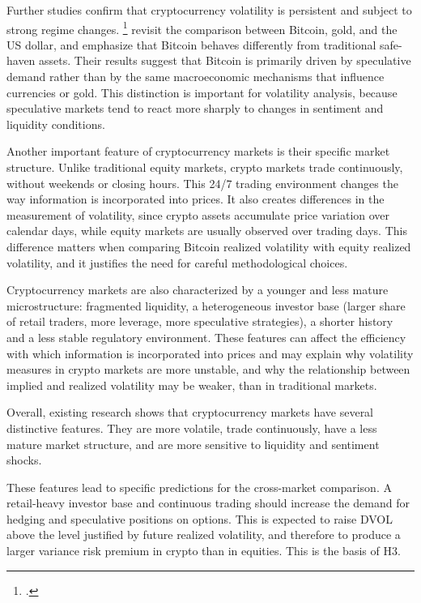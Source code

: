 \documentclass[11pt,a4paper,openany]{report}
\newcommand{\fcitet}[1]{\citet{#1}\footnote{\bibentry{#1}.}}
\begin{document}
Further studies confirm that cryptocurrency volatility is persistent and
subject to strong regime changes. \fcitet{baur2018} revisit the comparison between
Bitcoin, gold, and the US dollar, and emphasize that Bitcoin behaves
differently from traditional safe-haven assets. Their results suggest
that Bitcoin is primarily driven by speculative demand rather than by
the same macroeconomic mechanisms that influence currencies or gold.
This distinction is important for volatility analysis, because
speculative markets tend to react more sharply to changes in sentiment
and liquidity conditions.

Another important feature of cryptocurrency markets is their specific
market structure. Unlike traditional equity markets, crypto markets
trade continuously, without weekends or closing hours. This 24/7 trading
environment changes the way information is incorporated into prices. It
also creates differences in the measurement of volatility, since crypto
assets accumulate price variation over calendar days, while equity
markets are usually observed over trading days. This difference matters
when comparing Bitcoin realized volatility with equity realized
volatility, and it justifies the need for careful methodological
choices.

Cryptocurrency markets are also characterized by a younger and less
mature microstructure: fragmented liquidity, a heterogeneous investor
base (larger share of retail traders, more leverage, more speculative
strategies), a shorter history and a less stable regulatory
environment. These features can affect the efficiency with which
information is incorporated into prices and may explain why volatility
measures in crypto markets are more unstable, and why the relationship
between implied and realized volatility may be weaker, than in
traditional markets.

Overall, existing research shows that cryptocurrency markets have
several distinctive features. They are more volatile, trade
continuously, have a less mature market structure, and are more
sensitive to liquidity and sentiment shocks.

These features lead to specific predictions for the cross-market
comparison. A retail-heavy investor base and continuous trading should
increase the demand for hedging and speculative positions on options.
This is expected to raise DVOL above the level justified by future
realized volatility, and therefore to produce a larger variance risk
premium in crypto than in equities. This is the basis of H3.
\end{document}
